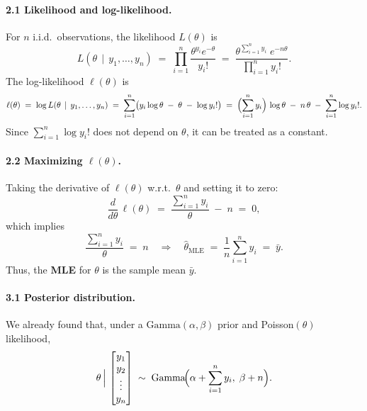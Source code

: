 \documentclass[final,11pt]{article}
\begin{document}
\begin{spacing}{1.25}
{\begin{enumerate}
    \paragraph{2.1 Likelihood and log-likelihood.}
    For $n$ i.i.d.\ observations, the likelihood $L(\theta)$ is
    \[
    L(\theta \,\mid\, y_1, \dots, y_n)
    \;=\;
    \prod_{i=1}^n \frac{\theta^{y_i} e^{-\theta}}{y_i!}
    \;=\;
    \frac{\theta^{\sum_{i=1}^n y_i}\; e^{-n \theta}}{\prod_{i=1}^n y_i!}.
    \]
    The log-likelihood $\ell(\theta)$ is
    \[
    \ell(\theta)
    \;=\;
    \log L(\theta \,\mid\, y_1, \dots, y_n)
    \;=\;
    \sum_{i=1}^n \bigl(y_i \log \theta \;-\; \theta \;-\; \log y_i!\bigr)
    \;=\;
    \Bigl(\sum_{i=1}^n y_i\Bigr)\,\log \theta 
    \;-\;
    n\,\theta
    \;-\;
    \sum_{i=1}^n \log y_i!.
    \]
    Since $\sum_{i=1}^n \log y_i!$ does not depend on $\theta$, it can be treated as a constant.

    \paragraph{2.2 Maximizing $\ell(\theta)$.}
    Taking the derivative of $\ell(\theta)$ w.r.t.\ $\theta$ and setting it to zero:
    \[
    \frac{d}{d\theta}\,\ell(\theta)
    \;=\;
    \frac{\sum_{i=1}^n y_i}{\theta}
    \;-\;
    n
    \;=\;
    0,
    \]
    which implies
    \[
      \frac{\sum_{i=1}^n y_i}{\theta} \;=\; n
      \quad\Longrightarrow\quad
      \hat{\theta}_{\mathrm{MLE}}
      \;=\;
      \frac{1}{n} \sum_{i=1}^n y_i
      \;=\;
      \bar{y}.
    \]
    Thus, the \textbf{MLE} for $\theta$ is the sample mean $\bar{y}$.

    \paragraph{3.1 Posterior distribution.}
    We already found that, under a $\mathrm{Gamma}(\alpha, \beta)$ prior and Poisson$(\theta)$ likelihood,
    \[
      \theta 
      \,\Big|\,
      \begin{bmatrix}y_1 \\ y_2 \\ \vdots \\ y_n\end{bmatrix}
      \;\sim\;
      \mathrm{Gamma}\!\Bigl(\alpha + \sum_{i=1}^n y_i,\;\beta + n\Bigr).
    \]


\end{enumerate}}
\end{spacing}
\end{document}
